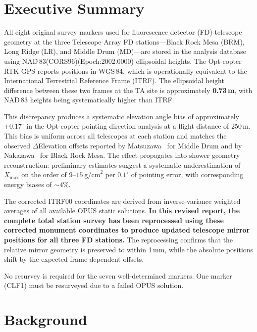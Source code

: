 \documentclass[11pt,letterpaper]{article}
\newcommand{\degree}{^\circ}
\newcommand{\Xmax}{X_{\text{max}}}
\begin{document}
\section{Executive Summary}

All eight original survey markers used for fluorescence detector (FD) telescope geometry at the three Telescope Array FD stations---Black Rock Mesa (BRM), Long Ridge (LR), and Middle Drum (MD)---are stored in the analysis database using NAD\,83(CORS96)(Epoch:2002.0000) ellipsoidal heights. The Opt-copter RTK-GPS reports positions in WGS\,84, which is operationally equivalent to the International Terrestrial Reference Frame (ITRF). The ellipsoidal height difference between these two frames at the TA site is approximately \textbf{0.73\,m}, with NAD\,83 heights being systematically higher than ITRF.

This discrepancy produces a systematic elevation angle bias of approximately $+0.17\degree$ in the Opt-copter pointing direction analysis at a flight distance of 250\,m. This bias is uniform across all telescopes at each station and matches the observed $\Delta$Elevation offsets reported by Matsuzawa~\cite{matsuzawa2025} for Middle Drum and by Nakazawa~\cite{nakazawa2020} for Black Rock Mesa. The effect propagates into shower geometry reconstruction: preliminary estimates suggest a systematic underestimation of $\Xmax$ on the order of $9\text{--}15~\text{g/cm}^2$ per $0.1\degree$ of pointing error, with corresponding energy biases of $\sim\!4\%$.

The corrected ITRF00 coordinates are derived from inverse-variance weighted averages of all available OPUS static solutions. \textbf{In this revised report, the complete total station survey has been reprocessed using these corrected monument coordinates to produce updated telescope mirror positions for all three FD stations.} The reprocessing confirms that the relative mirror geometry is preserved to within 1\,mm, while the absolute positions shift by the expected frame-dependent offsets.

No resurvey is required for the seven well-determined markers. One marker (CLF1) must be resurveyed due to a failed OPUS solution.

\section{Background}
\end{document}

